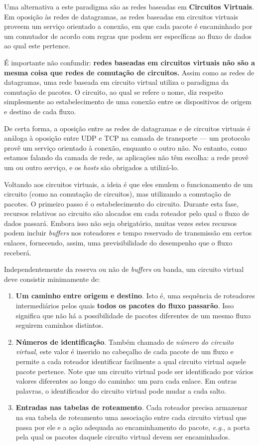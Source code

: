 \documentclass{article}
\begin{document}
Uma alternativa a este paradigma são as redes baseadas em \textbf{Circuitos Virtuais}. Em oposição às redes de datagramas, as redes baseadas em circuitos virtuais proveem um serviço orientado a conexão, em que cada pacote é encaminhado por um comutador de acordo com regras que podem ser específicas ao fluxo de dados ao qual este pertence.

É importante não confundir: \textbf{redes baseadas em circuitos virtuais não são a mesma coisa que redes de comutação de circuitos.} Assim como as redes de datagramas, uma rede baseada em circuito virtual utiliza o paradigma da comutação de pacotes. O circuito, ao qual se refere o nome, diz respeito simplesmente ao estabelecimento de uma conexão entre os dispositivos de origem e destino de cada fluxo.

De certa forma, a oposição entre as redes de datagramas e de circuitos virtuais é análoga à oposição entre UDP e TCP na camada de transporte --- um protocolo provê um serviço orientado à conexão, enquanto o outro não. No entanto, como estamos falando da camada de rede, as aplicações não têm escolha: a rede provê um ou outro serviço, e os \textit{hosts} são obrigados a utilizá-lo.

Voltando aos circuitos virtuais, a ideia é que eles emulem o funcionamento de um circuito (como na comutação de circuitos), mas utilizando a comutação de pacotes. O primeiro passo é o estabelecimento do circuito. Durante esta fase, recursos relativos ao circuito são alocados em cada roteador pelo qual o fluxo de dados passará. Embora isso não seja obrigatório, muitas vezes estes recursos podem incluir \textit{buffers} nos roteadores e tempo reservado de transmissão em certos enlaces, fornecendo, assim, uma previsibilidade do desempenho que o fluxo receberá.

Independentemente da reserva ou não de \textit{buffers} ou banda, um circuito virtual deve consistir minimamente de:
\begin{enumerate}
    \item \textbf{Um caminho entre origem e destino}. Isto é, uma sequência de roteadores intermediários pelos quais \textbf{todos os pacotes do fluxo passarão}. Isso significa que não há a possibilidade de pacotes diferentes de um mesmo fluxo seguirem caminhos distintos.
    \item \textbf{Números de identificação}. Também chamado de \textit{número do circuito virtual}, este valor é inserido no cabeçalho de cada pacote de um fluxo e permite a cada roteador identificar facilmente a qual circuito virtual aquele pacote pertence. Note que um circuito virtual pode ser identificado por vários valores diferentes ao longo do caminho: um para cada enlace. Em outras palavras, o identificador do circuito virtual pode mudar a cada salto.
    \item \textbf{Entradas nas tabelas de roteamento}. Cada roteador precisa armazenar na sua tabela de roteamento uma associação entre cada circuito virtual que passa por ele e a ação adequada ao encaminhamento do pacote, \textit{e.g.}, a porta pela qual os pacotes daquele circuito virtual devem ser encaminhados.
\end{enumerate}
\end{document}
